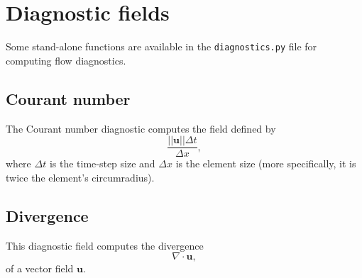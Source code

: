 \documentclass[a4paper,11pt]{report}
\begin{document}
\chapter{Diagnostic fields}
Some stand-alone functions are available in the \texttt{diagnostics.py} file for computing flow diagnostics.

\section{Courant number}
The Courant number diagnostic computes the field defined by
\begin{equation}
   \frac{||\mathbf{u}||\Delta t}{\Delta x},
\end{equation}
where $\Delta t$ is the time-step size and $\Delta x$ is the element size (more specifically, it is twice the element's circumradius).

\section{Divergence}
This diagnostic field computes the divergence
\begin{equation}
   \nabla\cdot\mathbf{u},
\end{equation}
of a vector field $\mathbf{u}$.



\end{document}
